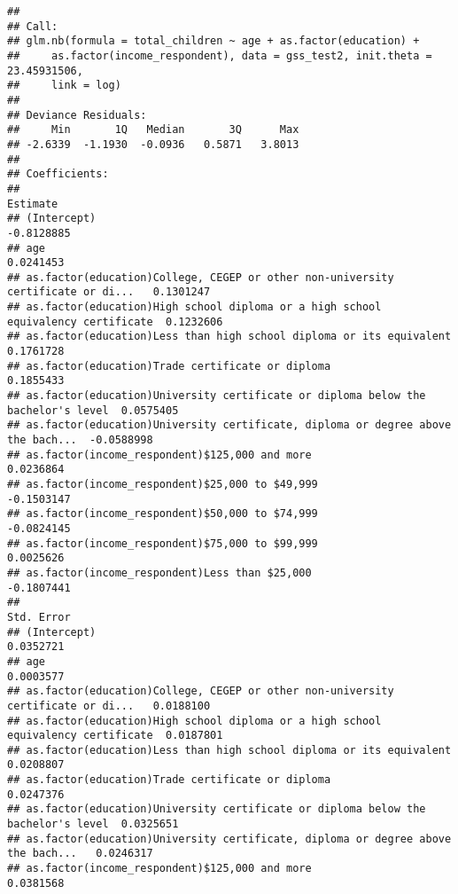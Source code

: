 \documentclass[
]{article}
\begin{document}
\begin{verbatim}
## 
## Call:
## glm.nb(formula = total_children ~ age + as.factor(education) + 
##     as.factor(income_respondent), data = gss_test2, init.theta = 23.45931506, 
##     link = log)
## 
## Deviance Residuals: 
##     Min       1Q   Median       3Q      Max  
## -2.6339  -1.1930  -0.0936   0.5871   3.8013  
## 
## Coefficients:
##                                                                                    Estimate
## (Intercept)                                                                      -0.8128885
## age                                                                               0.0241453
## as.factor(education)College, CEGEP or other non-university certificate or di...   0.1301247
## as.factor(education)High school diploma or a high school equivalency certificate  0.1232606
## as.factor(education)Less than high school diploma or its equivalent               0.1761728
## as.factor(education)Trade certificate or diploma                                  0.1855433
## as.factor(education)University certificate or diploma below the bachelor's level  0.0575405
## as.factor(education)University certificate, diploma or degree above the bach...  -0.0588998
## as.factor(income_respondent)$125,000 and more                                     0.0236864
## as.factor(income_respondent)$25,000 to $49,999                                   -0.1503147
## as.factor(income_respondent)$50,000 to $74,999                                   -0.0824145
## as.factor(income_respondent)$75,000 to $99,999                                    0.0025626
## as.factor(income_respondent)Less than $25,000                                    -0.1807441
##                                                                                  Std. Error
## (Intercept)                                                                       0.0352721
## age                                                                               0.0003577
## as.factor(education)College, CEGEP or other non-university certificate or di...   0.0188100
## as.factor(education)High school diploma or a high school equivalency certificate  0.0187801
## as.factor(education)Less than high school diploma or its equivalent               0.0208807
## as.factor(education)Trade certificate or diploma                                  0.0247376
## as.factor(education)University certificate or diploma below the bachelor's level  0.0325651
## as.factor(education)University certificate, diploma or degree above the bach...   0.0246317
## as.factor(income_respondent)$125,000 and more                                     0.0381568

\end{verbatim}
\end{document}

